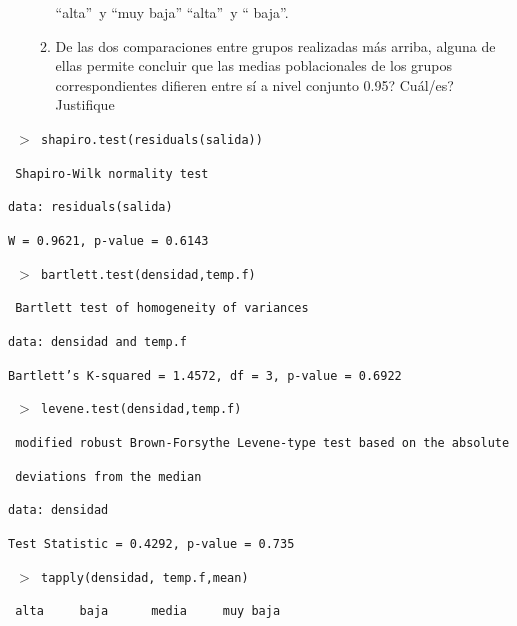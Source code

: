 \documentclass[11pt,a4paper,twoside]{article}%
\begin{document}
\begin{enumerate}
\begin{enumerate}
\textquotedblleft alta\textquotedblright\ y \textquotedblleft muy
baja\textquotedblright\makebox[\linewidth]{\dotfill}\vskip0.1in
\textquotedblleft alta\textquotedblright\ y \textquotedblleft
baja\textquotedblright\makebox[\linewidth]{\dotfill}.

\item De las dos comparaciones entre grupos realizadas m\'as arriba,
\textquestiondown alguna de ellas permite concluir que las medias
poblacionales de los grupos correspondientes difieren entre s\'i a nivel conjunto 0.95?
\textquestiondown Cu\'al/es? Justifique
% 
\vskip0.1in \makebox[\linewidth]{\dotfill}\vskip0.1in \makebox[\linewidth]{\dotfill}
\end{enumerate}
\end{enumerate}

\texttt{%
$>$
shapiro.test(residuals(salida))}

\texttt{\ Shapiro-Wilk normality test}

\texttt{data: residuals(salida) }

\texttt{W = 0.9621, p-value = 0.6143}

\texttt{%
$>$
bartlett.test(densidad,temp.f)}

\texttt{ Bartlett test of homogeneity of variances}

\texttt{data: densidad and temp.f }

\texttt{Bartlett's K-squared = 1.4572, df = 3, p-value = 0.6922}

\texttt{%
$>$
levene.test(densidad,temp.f)}

\texttt{ modified robust Brown-Forsythe Levene-type test based on the
absolute}

\texttt{ deviations from the median}

\texttt{data: densidad }

\texttt{Test Statistic = 0.4292, p-value = 0.735}

\texttt{%
$>$
tapply(densidad, temp.f,mean)}

\texttt{ alta \ \ \ \ baja \ \ \ \ \ media \ \ \ \ muy baja }
\end{document}
